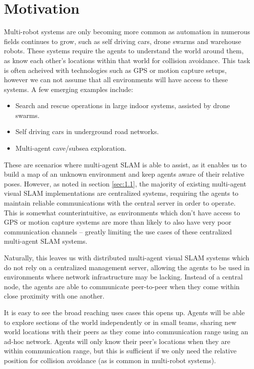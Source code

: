 \section{Motivation}
\label{sec:1.2}
Multi-robot systems are only becoming more common as automation in numerous fields continues to grow, such as self driving cars, drone swarms and warehouse robots. These systems require the agents to understand the world around them, as know each other's locations within that world for collision avoidance. This task is often acheived with technologies such as GPS or motion capture setups, however we can not assume that all environments will have access to these systems. A few emerging examples include: \noparskip
\smallbreak
{
    \begin{itemize}[nosep]
        \item Search and rescue operations in large indoor systems, assisted by drone swarms.
        \item Self driving cars in underground road networks.
        \item Multi-agent cave/subsea exploration.
    \end{itemize}
}

These are scenarios where multi-agent SLAM is able to assist, as it enables us to build a map of an unknown environment and keep agents aware of their relative poses. However, as noted in section \ref{sec:1.1}, the majority of existing multi-agent visual SLAM implementations are centralized systems, requiring the agents to maintain reliable communications with the central server in order to operate. This is somewhat counterintuitive, as environments which don't have access to GPS or motion capture systems are more than likely to also have very poor communication channels -- greatly limiting the use cases of these centralized multi-agent SLAM systems.

Naturally, this leaves us with distributed multi-agent visual SLAM systems which do not rely on a centralized management server, allowing the agents to be used in environments where network infrastructure may be lacking. Instead of a central node, the agents are able to communicate peer-to-peer when they come within close proximity with one another.

It is easy to see the broad reaching uses cases this opens up. Agents will be able to explore sections of the world independently or in small teams, sharing new world locations with their peers as they come into communication range using an ad-hoc network. Agents will only know their peer's locations when they are within communication range, but this is sufficient if we only need the relative position for collision avoidance (as is common in multi-robot systems).

